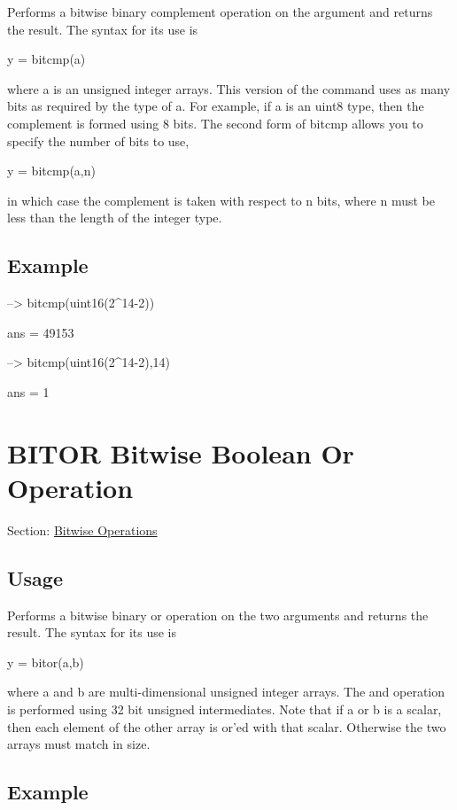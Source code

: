 Performs a bitwise binary complement operation on the argument and returns the result. The syntax for its use is \begin{DoxyVerb}    y = bitcmp(a)
\end{DoxyVerb}
 where a is an unsigned integer arrays. This version of the command uses as many bits as required by the type of a. For example, if a is an uint8 type, then the complement is formed using 8 bits. The second form of bitcmp allows you to specify the number of bits to use, \begin{DoxyVerb}    y = bitcmp(a,n)
\end{DoxyVerb}
 in which case the complement is taken with respect to n bits, where n must be less than the length of the integer type.\hypertarget{variables_struct_Example}{}\subsection{Example}\label{variables_struct_Example}

\begin{DoxyVerbInclude}
--> bitcmp(uint16(2^14-2))

ans = 
 49153 

--> bitcmp(uint16(2^14-2),14)

ans = 
 1 
\end{DoxyVerbInclude}
 \hypertarget{binary_bitor}{}\section{B\-I\-T\-O\-R Bitwise Boolean Or Operation}\label{binary_bitor}
Section\-: \hyperlink{sec_binary}{Bitwise Operations} \hypertarget{vtkwidgets_vtkxyplotwidget_Usage}{}\subsection{Usage}\label{vtkwidgets_vtkxyplotwidget_Usage}
Performs a bitwise binary or operation on the two arguments and returns the result. The syntax for its use is \begin{DoxyVerb}   y = bitor(a,b)
\end{DoxyVerb}
 where {\ttfamily a} and {\ttfamily b} are multi-\/dimensional unsigned integer arrays. The and operation is performed using 32 bit unsigned intermediates. Note that if a or b is a scalar, then each element of the other array is or'ed with that scalar. Otherwise the two arrays must match in size. \hypertarget{variables_struct_Example}{}\subsection{Example}\label{variables_struct_Example}

